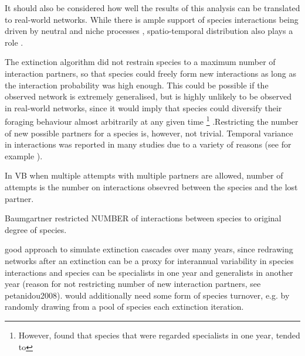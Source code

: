 \documentclass[12pt,a4paper]{article}
\begin{document}


It should also be considered how well the results of this analysis can be translated to real-world networks. While there is ample support of species interactions being driven by neutral and niche processes \parencite{Jordano2003, Rezende2007, Vazquez2007, Blüthgen2008}, spatio-temporal distribution also plays a role \parencite{}.


The extinction algorithm did not restrain species to a maximum number of interaction partners, so that species could freely form new interactions as long as the interaction probability was high enough. This could be possible if the observed network is extremely generalised, but is highly unlikely to be observed in real-world networks, since it would imply that species could diversify their foraging behaviour almost arbitrarily at any given time \footnote{However, \citeauthor{Petanidou2008} found that species that were regarded specialists in one year, tended to} .Restricting the number of new possible partners for a species is, however, not trivial. Temporal variance in interactions was reported in many studies due to a variety of reasons (see for example \cite{Olesen2008, Caradonna2017, Schwarz2021}).

In VB when multiple attempts with multiple partners are allowed, number of attempts is the number on interactions obsevred between the species and the lost partner.

Baumgartner restricted NUMBER of interactions between species to original degree of species.


good approach to simulate extinction cascades over many years, since redrawing networks after an extinction can be a proxy for interannual variability in species interactions and species can be specialists in one year and generalists in another year (reason for not restricting number of new interaction partners, see petanidou2008). would additionally need some form of species turnover, e.g. by randomly drawing from a pool of species each extinction iteration.
\end{document}
